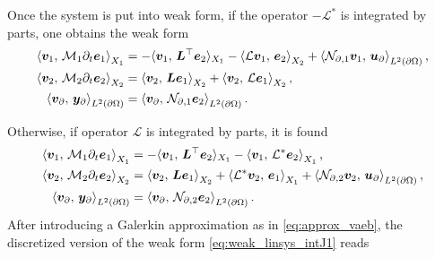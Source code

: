 Once the system is put into weak form, if the operator $\mathcal{-L^*}$ is integrated by parts, one obtains the weak form 
\begin{equation}\label{eq:weak_linsys_intJ1}
\begin{aligned}
\inner[X_1]{\bm{v}_1}{\mathcal{M}_1 \partial_t \bm{e}_1} &=   -  \langle{\bm{v}_1}, \,{\bm{L}^\top \bm{e}_2}\rangle_{X_1}  -\inner[X_2]{\mathcal{L}\bm{v}_1}{\bm{e}_2} + \inner[L^2(\partial \Omega)]{\mathcal{N}_{\partial, 1} \bm{v}_1}{\bm{u}_\partial}, \\
\inner[X_2]{\bm{v}_2}{\mathcal{M}_2 \partial_t \bm{e}_2} &=   \inner[X_2]{\bm{v}_2}{\bm{L}\bm{e}_1} + \inner[X_2]{\bm{v}_2}{\mathcal{L}\bm{e}_1}, \\
\inner[L^2(\partial \Omega)]{\bm{v}_\partial}{\bm{y}_\partial} &= \inner[L^2(\partial \Omega)]{\bm{v}_\partial}{\mathcal{N}_{\partial, 1}\bm{e}_2}.
\end{aligned}
\end{equation}

Otherwise, if operator $\mathcal{L}$ is integrated by parts, it is found  
\begin{equation}\label{eq:weak_linsys_intJ2}
\begin{aligned}
\inner[X_1]{\bm{v}_1}{\mathcal{M}_1 \partial_t \bm{e}_1} &=   -  \langle{\bm{v}_1}, \,{\bm{L}^\top \bm{e}_2}\rangle_{X_1}  -\inner[X_1]{\bm{v}_1}{\mathcal{L}^*\bm{e}_2}, \\
\inner[X_2]{\bm{v}_2}{\mathcal{M}_2 \partial_t \bm{e}_2} &=   \inner[X_2]{\bm{v}_2}{\bm{L}\bm{e}_1}  + \inner[X_1]{\mathcal{L}^*\bm{v}_2}{\bm{e}_1} + \inner[L^2(\partial \Omega)]{\mathcal{N}_{\partial, 2} \bm{v}_2}{\bm{u}_{\partial}}, \\
\inner[L^2(\partial \Omega)]{\bm{v}_\partial}{\bm{y}_\partial} &= \inner[L^2(\partial \Omega)]{\bm{v}_\partial}{\mathcal{N}_{\partial, 2}\bm{e}_2}.
\end{aligned}
\end{equation}
After introducing a Galerkin approximation as in \eqref{eq:approx_vaeb}, the discretized version of the weak form \eqref{eq:weak_linsys_intJ1} reads

